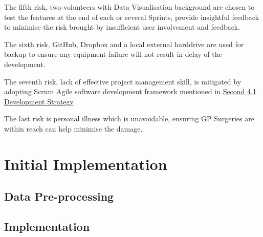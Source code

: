 \documentclass[doc,natbib]{apa6}
\begin{document}
The fifth risk, two volunteers with Data Visualisation background are chosen to test the features at the end of each or several Sprints, provide insightful feedback to minimise the risk brought by insufficient user involvement and feedback.

The sixth risk, GitHub, Dropbox and a local external harddrive are used for backup to ensure any equipment failure will not result in delay of the development.

The seventh risk, lack of effective project management skill, is mitigated by adopting Scrum Agile software development framework mentioned in \hyperref[Development Strategy]{Second 4.1 Development Strategy}.

The last risk is personal illness which is unavoidable, ensuring GP Surgeries are within reach can help minimise the damage.

\section{Initial Implementation}
\label{sec5}
\subsection{Data Pre-processing}

\subsection{Implementation}


\cleardoublepage


\end{document}
